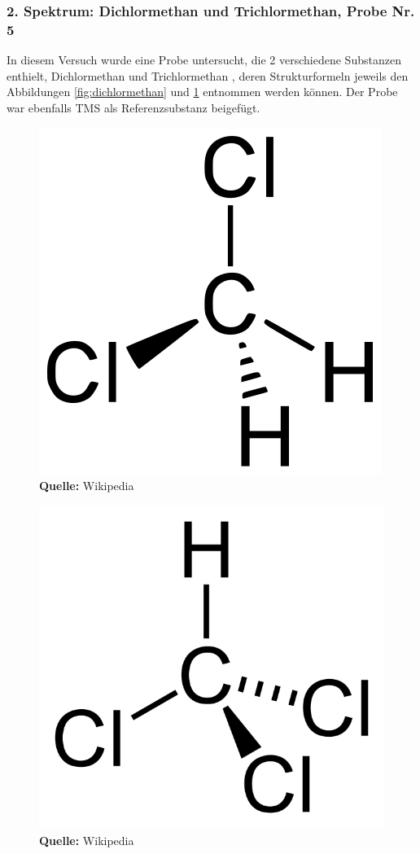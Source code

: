 \documentclass[a4paper,titlepage]{scrartcl}
\numberwithin{equation}{section}
\begin{document}
\subsubsection{2. Spektrum: Dichlormethan und Trichlormethan, Probe Nr. 5}
In diesem Versuch wurde eine Probe untersucht, die 2 verschiedene Substanzen enthielt, Dichlormethan  und Trichlormethan , deren Strukturformeln jeweils den Abbildungen \ref{fig:dichlormethan} und \ref{fig:trichlormethan} entnommen werden können. Der Probe war ebenfalls TMS als Referenzsubstanz beigefügt.
\begin{figure}[H]
\centering
\begin{minipage}{.35\textwidth}
	\centering
  	\includegraphics[width=.5\linewidth]{dichlormethan.png}\\
  	\footnotesize\sffamily\textbf{Quelle:} Wikipedia \cite{wiki:dichlormethan}
    \captionsetup{width=0.8\textwidth}
  	\label{fig:dichlormethan}
\end{minipage}%
\begin{minipage}{.35\textwidth}
	\centering
	\includegraphics[width=.5\linewidth]{trichlormethan.png}\\
	\footnotesize\sffamily\textbf{Quelle:} Wikipedia \cite{wiki:trichlormethan}
	\captionsetup{width=0.8\textwidth}
	\label{fig:trichlormethan}
\end{minipage}
\end{figure}
\end{document}
